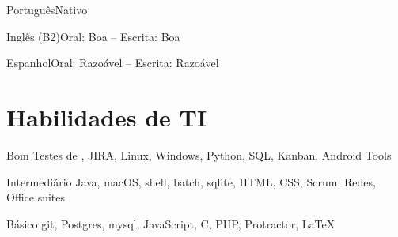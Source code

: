 \documentclass[fontsize=10pt]{tccv}
\begin{document}
\begin{factlist}
\item{Português}{Nativo}
\item{Inglês (B2)}{Oral: Boa -- Escrita: Boa}
\item{Espanhol}{Oral: Razoável -- Escrita: Razoável}
\end{factlist}

\section{Habilidades de TI}

\begin{factlist}

\item{Bom}
     {Testes de , JIRA, Linux, Windows, Python, SQL, Kanban, Android Tools}

\item{Intermediário}
     {Java, macOS, shell, batch, sqlite, HTML, CSS, Scrum, Redes, Office suites}

\item{Básico}
     {git, Postgres, mysql, JavaScript, C, PHP, Protractor, \LaTeX}

\end{factlist}
\end{document}
